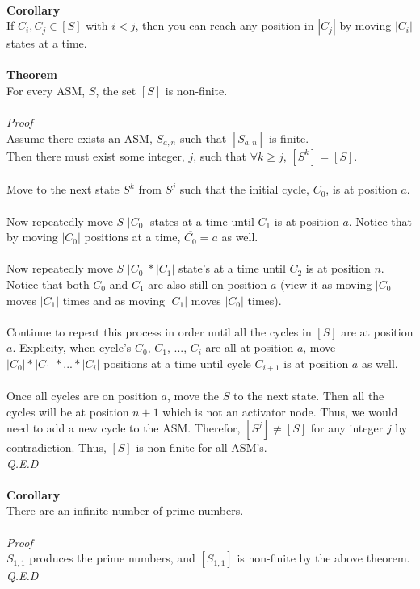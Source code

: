\documentclass[a4paper,12pt]{article}
\begin{document}
\\
\textbf{Corollary}\\
If $C_i, C_j \in [S]$ with $i < j$, then you can reach any position in $|C_j|$ by moving $|C_i|$ states at a time.\\
\\
\textbf{Theorem}\\
For every ASM, $S$, the set $[S]$ is non-finite.\\
\\
\textit{Proof}\\  
Assume there exists an ASM, $S_{a,n}$ such that $[S_{a,n}]$ is finite.\\
Then there must exist some integer, $j$, such that $\forall k \geq j$, $[S^k] = [S]$.\\
\\
Move to the next state $S^k$ from $S^j$ such that the initial cycle, $C_0$, is at position $a$.\\
\\
Now repeatedly move $S$ $|C_0|$ states at a time until $C_1$ is at position $a$. Notice that by moving $|C_0|$ positions at a time, $\overline{C_0} = a$ as well.\\
\\
Now repeatedly move $S$ $|C_0|*|C_1|$ state's at a time until $C_2$ is at position $n$. Notice that both $C_0$ and $C_1$ are also still on position $a$ (view it as moving $|C_0|$ moves $|C_1|$ times and as moving $|C_1|$ moves $|C_0|$ times).\\
\\
Continue to repeat this process in order until all the cycles in $[S]$ are at position $a$. Explicity, when cycle's $C_0$, $C_1$, ..., $C_i$ are all at position $a$, move $|C_0|*|C_1|*...*|C_i|$ positions at a time until cycle $C_{i+1}$ is at position $a$ as well.\\
\\
Once all cycles are on position $a$, move the $S$ to the next state. Then all the cycles will be at position $n + 1$ which is not an activator node. Thus, we would need to add a new cycle to the ASM. Therefor, $[S^j] \neq [S]$ for any integer $j$ by contradiction. Thus, $[S]$ is non-finite for all ASM's.\\
\textit{Q.E.D}\\     
\\
\textbf{Corollary}\\
There are an infinite number of prime numbers.\\
\\
\textit{Proof}\\ 
$S_{1,1}$ produces the prime numbers, and $[S_{1,1}]$ is non-finite by the above theorem.\\
\textit{Q.E.D}\\
\end{document}
